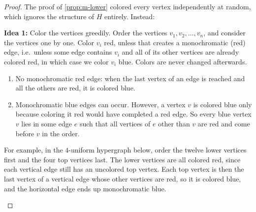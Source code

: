 \begin{proof}
    The proof of \autoref{prop:m-lower} colored every vertex independently at random, which ignores the structure of \(H\) entirely. Instead:

    \textbf{Idea 1:} Color the vertices greedily. Order the vertices \(v_1, v_2, \ldots, v_n\), and consider the vertices one by one. Color \(v_i\) red, unless that creates a monochromatic (red) edge, i.e.\ unless some edge contains \(v_i\) and all of its other vertices are already colored red, in which case we color \(v_i\) blue. Colors are never changed afterwards.

    \begin{observation}
        \hfill
        \begin{enumerate}[(1)]
        \item No monochromatic red edge: when the last vertex of an edge is reached and all the others are red, it is colored blue.
        \item Monochromatic blue edges can occur. However, a vertex \(v\) is colored blue only because coloring it red would have completed a red edge. So every blue vertex \(v\) lies in some edge \(e\) such that all vertices of \(e\) other than \(v\) are red and come before \(v\) in the order.
        \end{enumerate}
    \end{observation}
    For example, in the \(4\)-uniform hypergraph below, order the twelve lower vertices first and the four top vertices last. The lower vertices are all colored red, since each vertical edge still has an uncolored top vertex. Each top vertex is then the last vertex of a vertical edge whose other vertices are red, so it is colored blue, and the horizontal edge ends up monochromatic blue.
    \begin{center}

\end{center}
\end{proof}
